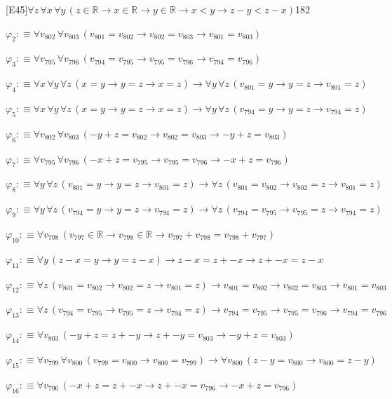 \begin{fullproof}{[E45]}{$\forall z\,\forall x\,\forall y\,(z \in \mathbb{R} \to x \in \mathbb{R} \to y \in \mathbb{R} \to x < y \to z - y < z - x)$}{182}
\begin{abbrevlist}
\item $\varphi_{2} :\equiv \forall v_{802}\,\forall v_{803}\,(v_{801} = v_{802} \to v_{802} = v_{803} \to v_{801} = v_{803})$
\item $\varphi_{3} :\equiv \forall v_{795}\,\forall v_{796}\,(v_{794} = v_{795} \to v_{795} = v_{796} \to v_{794} = v_{796})$
\item $\varphi_{4} :\equiv \forall x\,\forall y\,\forall z\,(x = y \to y = z \to x = z) \to \forall y\,\forall z\,(v_{801} = y \to y = z \to v_{801} = z)$
\item $\varphi_{5} :\equiv \forall x\,\forall y\,\forall z\,(x = y \to y = z \to x = z) \to \forall y\,\forall z\,(v_{794} = y \to y = z \to v_{794} = z)$
\item $\varphi_{6} :\equiv \forall v_{802}\,\forall v_{803}\,(-y + z = v_{802} \to v_{802} = v_{803} \to -y + z = v_{803})$
\item $\varphi_{7} :\equiv \forall v_{795}\,\forall v_{796}\,(-x + z = v_{795} \to v_{795} = v_{796} \to -x + z = v_{796})$
\item $\varphi_{8} :\equiv \forall y\,\forall z\,(v_{801} = y \to y = z \to v_{801} = z) \to \forall z\,(v_{801} = v_{802} \to v_{802} = z \to v_{801} = z)$
\item $\varphi_{9} :\equiv \forall y\,\forall z\,(v_{794} = y \to y = z \to v_{794} = z) \to \forall z\,(v_{794} = v_{795} \to v_{795} = z \to v_{794} = z)$
\item $\varphi_{10} :\equiv \forall v_{798}\,(v_{797} \in \mathbb{R} \to v_{798} \in \mathbb{R} \to v_{797} + v_{798} = v_{798} + v_{797})$
\item $\varphi_{11} :\equiv \forall y\,(z - x = y \to y = z - x) \to z - x = z + -x \to z + -x = z - x$
\item $\varphi_{12} :\equiv \forall z\,(v_{801} = v_{802} \to v_{802} = z \to v_{801} = z) \to v_{801} = v_{802} \to v_{802} = v_{803} \to v_{801} = v_{803}$
\item $\varphi_{13} :\equiv \forall z\,(v_{794} = v_{795} \to v_{795} = z \to v_{794} = z) \to v_{794} = v_{795} \to v_{795} = v_{796} \to v_{794} = v_{796}$
\item $\varphi_{14} :\equiv \forall v_{803}\,(-y + z = z + -y \to z + -y = v_{803} \to -y + z = v_{803})$
\item $\varphi_{15} :\equiv \forall v_{799}\,\forall v_{800}\,(v_{799} = v_{800} \to v_{800} = v_{799}) \to \forall v_{800}\,(z - y = v_{800} \to v_{800} = z - y)$
\item $\varphi_{16} :\equiv \forall v_{796}\,(-x + z = z + -x \to z + -x = v_{796} \to -x + z = v_{796})$

\end{abbrevlist}
\end{fullproof}

